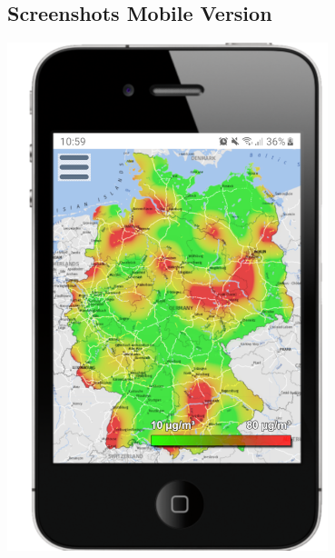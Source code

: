 \subsection{Screenshots Mobile Version}

	\begin{minipage}[b]{.5\linewidth} %
		\includegraphics[width=0.7\textwidth]{media/Startseite-Mobile-Version} 
	\end{minipage}
	\hspace{.05\linewidth}%
